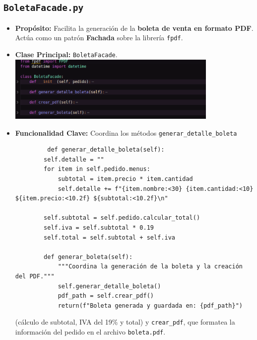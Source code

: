 \documentclass[a4paper, 12pt]{article}
\begin{document}
\subsection{\texttt{BoletaFacade.py}}
\begin{itemize}
    \item \textbf{Propósito:} Facilita la generación de la \textbf{boleta de venta en formato PDF}. Actúa como un patrón \textbf{Fachada} sobre la librería \texttt{fpdf}.
    \item \textbf{Clase Principal:} \texttt{BoletaFacade}.\\
\includegraphics[width=0.8\textwidth]{images/8.png}
    \item \textbf{Funcionalidad Clave:} Coordina los métodos \texttt{generar\_detalle\_boleta} 

    \begin{lstlisting}
         def generar_detalle_boleta(self):
        self.detalle = ""
        for item in self.pedido.menus:
            subtotal = item.precio * item.cantidad
            self.detalle += f"{item.nombre:<30} {item.cantidad:<10} ${item.precio:<10.2f} ${subtotal:<10.2f}\n"
        
        self.subtotal = self.pedido.calcular_total()
        self.iva = self.subtotal * 0.19
        self.total = self.subtotal + self.iva

        def generar_boleta(self):
            """Coordina la generación de la boleta y la creación del PDF."""
            self.generar_detalle_boleta()
            pdf_path = self.crear_pdf()
            return(f"Boleta generada y guardada en: {pdf_path}")

    \end{lstlisting}
    
    (cálculo de subtotal, IVA del 19\% y total) y \texttt{crear\_pdf}, que formatea la información del pedido en el archivo \texttt{boleta.pdf}.
\end{itemize}
\end{document}
